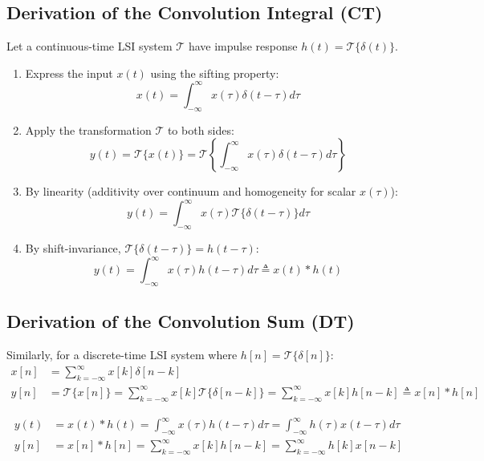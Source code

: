 \documentclass[12pt,a4paper]{article}
\begin{document}
\subsection{Derivation of the Convolution Integral (CT)}
Let a continuous-time LSI system $\mathcal{T}$ have impulse response $h(t) = \mathcal{T}\{\delta(t)\}$.
\begin{enumerate}[topsep=2pt, itemsep=2pt]
  \item Express the input $x(t)$ using the sifting property:
  \begin{equation}
    x(t) = \int_{-\infty}^{\infty} x(\tau) \delta(t - \tau) d\tau
  \end{equation}
  \item Apply the transformation $\mathcal{T}$ to both sides:
  \begin{equation}
    y(t) = \mathcal{T}\{x(t)\} = \mathcal{T}\left\{ \int_{-\infty}^{\infty} x(\tau) \delta(t - \tau) d\tau \right\}
  \end{equation}
  \item By linearity (additivity over continuum and homogeneity for scalar $x(\tau)$):
  \begin{equation}
    y(t) = \int_{-\infty}^{\infty} x(\tau) \mathcal{T}\{\delta(t - \tau)\} d\tau
  \end{equation}
  \item By shift-invariance, $\mathcal{T}\{\delta(t - \tau)\} = h(t - \tau)$:
  \begin{equation}
    y(t) = \int_{-\infty}^{\infty} x(\tau) h(t - \tau) d\tau \triangleq x(t) * h(t)
  \end{equation}
\end{enumerate}

\subsection{Derivation of the Convolution Sum (DT)}
Similarly, for a discrete-time LSI system where $h[n] = \mathcal{T}\{\delta[n]\}$:
\begin{align}
  x[n] &= \sum_{k=-\infty}^{\infty} x[k] \delta[n - k] \\
  y[n] &= \mathcal{T}\{x[n]\} = \sum_{k=-\infty}^{\infty} x[k] \mathcal{T}\{\delta[n - k]\} = \sum_{k=-\infty}^{\infty} x[k] h[n - k] \triangleq x[n] * h[n]
\end{align}

\begin{tcolorbox}[formulabox, title={\textbf{Core Formulation: Convolution Integral and Sum}}]
\begin{align}
  y(t) &= x(t) * h(t) = \int_{-\infty}^{\infty} x(\tau) h(t - \tau) d\tau = \int_{-\infty}^{\infty} h(\tau) x(t - \tau) d\tau \\
  y[n] &= x[n] * h[n] = \sum_{k=-\infty}^{\infty} x[k] h[n - k] = \sum_{k=-\infty}^{\infty} h[k] x[n - k]
\end{align}
\end{tcolorbox}
\end{document}
